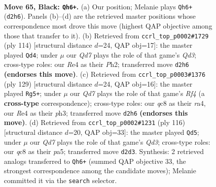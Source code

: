 \documentclass[11pt]{article}
\begin{document}
\clearpage

\begin{figure}[p]\centering
\begin{subfigure}{0.46\textwidth}\centering
\resizebox{\linewidth}{!}{%
\newchessgame
\chessboard[
  setfen={2Q5/8/5pk1/3p4/4r3/6PK/3q3P/8 b - - 11 65},
  showmover=false,
  pgfstyle=straightmove, color=movearrow, markmove={d2-h6}
]}
\caption{}
\end{subfigure}\hfill
\begin{subfigure}{0.46\textwidth}\centering
\resizebox{\linewidth}{!}{%
\newchessgame
\chessboard[
  setfen={8/8/2q3pk/4K2p/8/3Q2P1/5P1P/8 w - - 46 58},
  showmover=false,
  pgfstyle=straightmove, color=movearrow, markmove={d3-d4}
]}
\caption{}
\end{subfigure}
\\[4pt]
\begin{subfigure}{0.46\textwidth}\centering
\resizebox{\linewidth}{!}{%
\newchessgame
\chessboard[
  setfen={8/8/6pk/5r2/R7/6KP/5PP1/8 b - - 6 65},
  showmover=false,
  pgfstyle=straightmove, color=movearrow, markmove={f5-g5}
]}
\caption{}
\end{subfigure}\hfill
\begin{subfigure}{0.46\textwidth}\centering
\resizebox{\linewidth}{!}{%
\newchessgame
\chessboard[
  setfen={8/7p/5q1k/p5p1/8/3Q2P1/5P2/6K1 w - - 8 59},
  showmover=false,
  pgfstyle=straightmove, color=movearrow, markmove={d3-d5}
]}
\caption{}
\end{subfigure}
\caption{\textbf{Move 65, Black: \texttt{Qh6+}.} (a) Our position; Melanie plays \texttt{Qh6+} (\texttt{d2h6}). Panels (b)--(d) are the retrieved master positions whose correspondence most drove this move (highest QAP objective among those that transfer to it). (b) Retrieved from \texttt{ccrl\_top\_p0002\#1729} (ply 114) [structural distance $d$=24, QAP obj=17]: the master played \texttt{Qd4}; under $\mu$ our \emph{Qd7} plays the role of that game's \emph{Qd3}; cross-type roles: our \emph{R}e4 as their \emph{P}h2; transferred move \texttt{d2h6} \textbf{(endorses this move)}. (c) Retrieved from \texttt{ccrl\_top\_p0003\#1376} (ply 129) [structural distance $d$=24, QAP obj=16]: the master played \texttt{Rg5+}; under $\mu$ our \emph{Qd7} plays the role of that game's \emph{Rf4} (a \textbf{cross-type} correspondence); cross-type roles: our \emph{q}c8 as their \emph{r}a4, our \emph{R}e4 as their \emph{p}h3; transferred move \texttt{d2h6} \textbf{(endorses this move)}. (d) Retrieved from \texttt{ccrl\_top\_p0002\#1231} (ply 116) [structural distance $d$=20, QAP obj=33]: the master played \texttt{Qd5}; under $\mu$ our \emph{Qd7} plays the role of that game's \emph{Qd3}; cross-type roles: our \emph{q}c8 as their \emph{p}a5; transferred move \texttt{d2d3}. Synthesis: 2 retrieved analogs transferred to \texttt{Qh6+} (summed QAP objective 33, the strongest correspondence among the candidate moves); Melanie committed it via the \texttt{search} selector.}
\label{fig:thought-m129}
\end{figure}
\end{document}
